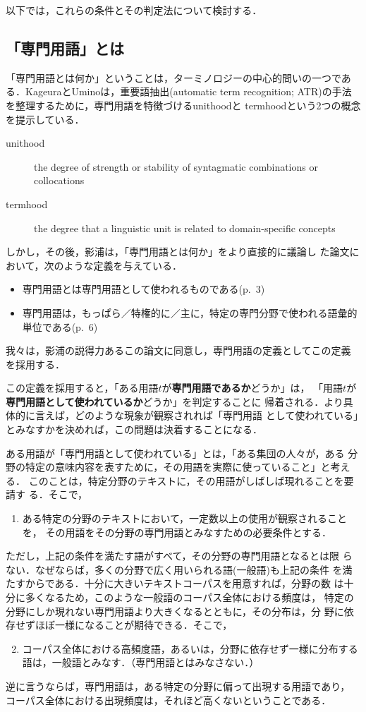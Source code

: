 以下では，これらの条件とその判定法について検討する．

\subsection{「専門用語」とは}\label{sec:term}

「専門用語とは何か」ということは，ターミノロジーの中心的問いの一つであ
る．KageuraとUmino\cite{kageura96atr_review}は，重要語抽出(automatic term
recognition; ATR)の手法を整理するために，専門用語を特徴づけるunithoodと
termhoodという2つの概念を提示している．
\begin{description}
\item[unithood] the degree of strength or stability of syntagmatic
combinations or collocations
\item[termhood] the degree that a linguistic unit is related to
domain-specific concepts
\end{description}
しかし，その後，影浦は，「専門用語とは何か」をより直接的に議論し
た論文\cite{kageura02terminology}において，次のような定義を与えている．
\begin{itemize}
\item 専門用語とは専門用語として使われるものである(p.~3)
\item 専門用語は，もっぱら／特権的に／主に，特定の専門分野で使われる語彙的
単位である(p.~6)
\end{itemize}
我々は，影浦の説得力あるこの論文に同意し，専門用語の定義としてこの定義
を採用する．

この定義を採用すると，「ある用語$t$が{\bf 専門用語であるか}どうか」は，
「用語$t$が{\bf 専門用語として使われているか}どうか」を判定することに
帰着される．より具体的に言えば，どのような現象が観察されれば「専門用語
として使われている」とみなすかを決めれば，この問題は決着することになる．

ある用語が「専門用語として使われている」とは，「ある集団の人々が，ある
分野の特定の意味内容を表すために，その用語を実際に使っていること」と考える．
このことは，特定分野のテキストに，その用語がしばしば現れることを要請す
る．そこで，
\begin{enumerate}
 \item ある特定の分野のテキストにおいて，一定数以上の使用が観察されることを，
その用語をその分野の専門用語とみなすための必要条件とする．
\end{enumerate}

ただし，上記の条件を満たす語がすべて，その分野の専門用語となるとは限
らない．なぜならば，多くの分野で広く用いられる語(一般語)も上記の条件
を満たすからである．十分に大きいテキストコーパスを用意すれば，分野の数
は十分に多くなるため，このような一般語のコーパス全体における頻度は，
特定の分野にしか現れない専門用語より大きくなるとともに，その分布は，分
野に依存せずほぼ一様になることが期待できる．そこで，
\begin{enumerate} \setcounter{enumi}{1}
 \item コーパス全体における高頻度語，あるいは，分野に依存せず一様に分布する
語は，一般語とみなす．（専門用語とはみなさない．）
\end{enumerate}
逆に言うならば，専門用語は，ある特定の分野に偏って出現する用語であり，
コーパス全体における出現頻度は，それほど高くないということである．

